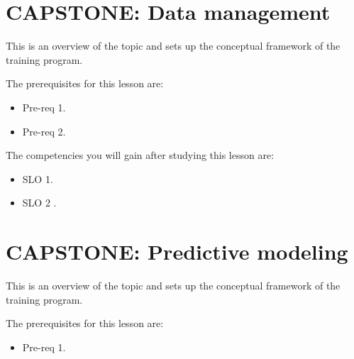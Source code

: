\section{CAPSTONE: Data management}
\label{sec:capstone-data-management}

This is an overview of the topic and sets up the conceptual framework of the training program.




The prerequisites for this lesson are: 




\begin{itemize}
    \item Pre-req 1.
\end{itemize}

\begin{itemize}
    \item Pre-req 2.
\end{itemize}




The competencies you will gain after studying this lesson are: 




\begin{itemize}
    \item SLO 1.
\end{itemize}

\begin{itemize}
    \item SLO 2 .
\end{itemize}

\section{CAPSTONE: Predictive modeling}
\label{sec:capstone-predictive-modeling}

This is an overview of the topic and sets up the conceptual framework of the training program.




The prerequisites for this lesson are: 




\begin{itemize}
    \item Pre-req 1.
\end{itemize}

